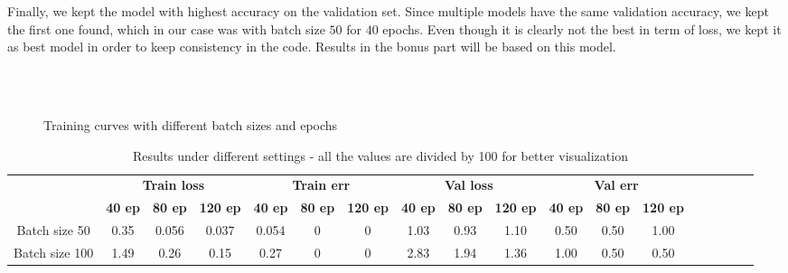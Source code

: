 \documentclass{article}
\begin{document}
Finally, we kept the model with highest accuracy on the validation set. Since multiple models have the same validation accuracy, we kept the first one found, which in our case was with batch size $50$ for $40$ epochs. Even though it is clearly not the best in term of loss, we kept it as best model in order to keep consistency in the code. Results in the bonus part will be based on this model. 

\begin{figure}[h]
    \centering
    \caption{Training curves with different batch sizes and epochs}
    \\
    \\
\label{fig:results}
\end{figure}


\begin{table}
	\centering
	\captionsetup{justification=centering}
	\renewcommand{\arraystretch}{1.5}
	\setlength{\abovecaptionskip}{15pt plus 3pt minus 2pt} %
	\begin{tabular}{|c|c|c|c|c|c|c|c|c|c|c|c|c|c|c|c|c|c|}
		\hline
		& \multicolumn{3}{c|}{\textbf{Train loss}} & \multicolumn{3}{c|}{\textbf{Train err}} & \multicolumn{3}{c|}{\textbf{Val loss}} & \multicolumn{3}{c|}{\textbf{Val err}} \\
		\cline{2-13}
		& \textbf{40 ep} & \textbf{80 ep} & \textbf{120 ep} & \textbf{40 ep} & \textbf{80 ep} & \textbf{120 ep} & \textbf{40 ep} & \textbf{80 ep} & \textbf{120 ep} & \textbf{40 ep} & \textbf{80 ep} & \textbf{120 ep}  \\
		\hline
	Batch size 50          & 0.35 & 0.056 & 0.037 & 0.054 & 0 & 0 & 1.03 & 0.93 & 1.10 & 0.50 & 0.50 & 1.00 \\ \hline
	Batch size 100          & 1.49 & 0.26 & 0.15 & 0.27 & 0 & 0 & 2.83 & 1.94 & 1.36 & 1.00 & 0.50 & 0.50 \\ \hline
	
	\end{tabular}
    \caption{Results under different settings - all the values are divided by 100 for better visualization}
	\label{tab:restab}
\end{table}
\end{document}
